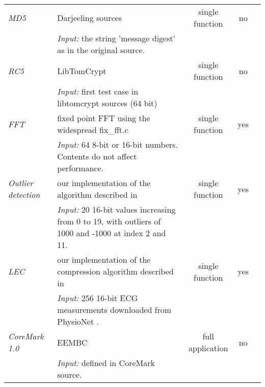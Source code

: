 \begin{table}
{\begin{tabular}{lp{}ccc}
    \emph{MD5}               & Darjeeling sources \cite{darjeelingsource}                                                                 & single function  & no             & \cite{Brouwers:2009cj, Ellul:2012thesis} \\
                             & \emph{Input:} the string 'message digest' as in the original source.                                       &                  &                & \\
    \emph{RC5}               & LibTomCrypt \cite{libtomcrypt}                                                                             & single function  & no             & \\
                             & \emph{Input:} first test case in libtomcrypt sources (64 bit)                                              &                  &                & \\
    \emph{FFT}               & fixed point FFT using the widespread fix\_fft.c \cite{sos-operating-system}                                & single function  & yes            & \cite{Kumar:2007ge}                      \\
                             & \emph{Input:} 64 8-bit or 16-bit numbers. Contents do not affect performance.                              &                  &                & \\
    \emph{Outlier detection} & our implementation of the algorithm described in \cite{Kumar:2007ge}                                       & single function  & yes            & \cite{Kumar:2007ge}                      \\
                             & \emph{Input:} 20 16-bit values increasing from 0 to 19, with outliers of 1000 and -1000 at index 2 and 11. &                  &                & \\
    \emph{LEC}               & our implementation of the compression algorithm described in \cite{Marcelloni:2009ja}                      & single function  & yes            & \\
                             & \emph{Input:} 256 16-bit ECG measurements downloaded from PhysioNet \cite{physionet-ecg-data}.             &                  &                & \\
    \emph{CoreMark 1.0}      & EEMBC \cite{coremark}                                                                                      & full application & no             & \\
                             & \emph{Input:} defined in CoreMark source.                                                                  &                  &                & \\

\end{tabular}}
\end{table}
